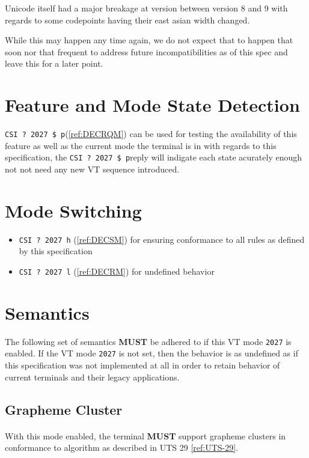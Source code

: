 \documentclass{article}
\newcommand{\code}[1]{\colorbox{light-gray}{\texttt{#1}}}
\newcommand{\DECRQM}[1]{\code{CSI ? #1 \$ p}}
\newcommand{\DECSET}[1]{\code{CSI ? #1 h}}
\newcommand{\DECRST}[1]{\code{CSI ? #1 l}}
\newcommand\VtModeNum{2027}                	%
\newcommand{\GCON}{\DECSET{\VtModeNum{}}}   %
\newcommand{\GCOFF}{\DECRST{\VtModeNum{}}}  %
\newcommand{\GCTEST}{\DECRQM{\VtModeNum{}}} %
\begin{document}
Unicode itself had a major breakage at version between version 8 and 9
with regards to some codepoints having their east asian width changed.

While this may happen any time again, we do not expect that to happen
that soon nor that frequent to address future incompatibilities
as of this spec and leave this for a later point.

\section{Feature and Mode State Detection}

\GCTEST (\ref{ref:DECRQM}) can be used for testing the availability of this
feature as well as the current mode the terminal is in with regards
to this specification, the \GCTEST reply will indigate each state
acurately enough not not need any new VT sequence introduced.

\section{Mode Switching}

\begin{itemize}
	\item \GCON{} (\ref{ref:DECSM}) for ensuring conformance to all rules as defined by this specification
    \item \GCOFF{} (\ref{ref:DECRM}) for undefined behavior
\end{itemize}

\section{Semantics}

The following set of semantics \textbf{MUST} be adhered to if this
VT mode \code{\VtModeNum} is enabled.
If the VT mode \code{\VtModeNum} is not set, then the behavior is as undefined
as if this specification was not implemented at all in order to retain
behavior of current terminals and their legacy applications.

\subsection{Grapheme Cluster}

\paragraph*{}
With this mode enabled, the terminal \textbf{MUST} support grapheme clusters
in conformance to algorithm as described in UTS 29 \ref{ref:UTS-29}.
\end{document}
